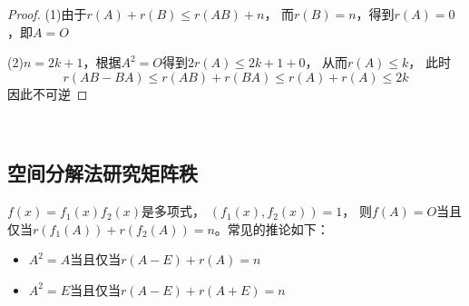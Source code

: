 \begin{proof}
  (1)由于$r(A) + r(B) \leq r(AB) + n$，
  而$r(B) = n$，得到$r(A) = 0$，即$A = O$

  (2)$n = 2k+1$，根据$A^2 = O$得到$2r(A) \leq 2k+1 + 0$，
  从而$r(A) \leq k$，
  此时
  \begin{equation*}
    r(AB - BA) \leq r(AB) + r(BA) \leq r(A) + r(A) \leq 2k
  \end{equation*}
  因此不可逆

\end{proof}

~

\subsection{空间分解法研究矩阵秩}

\begin{theorem}[多项式矩阵的秩关系]
  $f(x) = f_1(x)f_2(x)$是多项式，
  $(f_1(x),f_2(x)) = 1$，
  则$f(A) = O$当且仅当$r(f_1(A)) + r(f_2(A)) = n$。常见的推论如下：
  \begin{itemize}
  \item $A^2 = A$当且仅当$r(A - E) + r(A) = n$
  \item $A^2 = E$当且仅当$r(A - E) + r(A + E) = n$
  \end{itemize}
\end{theorem}

